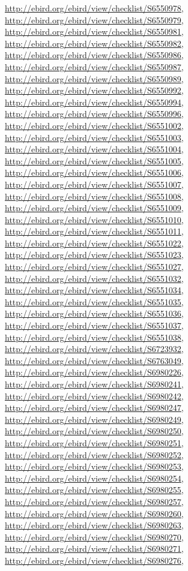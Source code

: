 \documentclass[9pt, article]{memoir}
\begin{document}
\begin{multicols}{2}
\url{http://ebird.org/ebird/view/checklist/S6550978}, 
\url{http://ebird.org/ebird/view/checklist/S6550979}, 
\url{http://ebird.org/ebird/view/checklist/S6550981}, 
\url{http://ebird.org/ebird/view/checklist/S6550982}, 
\url{http://ebird.org/ebird/view/checklist/S6550986}, 
\url{http://ebird.org/ebird/view/checklist/S6550987}, 
\url{http://ebird.org/ebird/view/checklist/S6550989}, 
\url{http://ebird.org/ebird/view/checklist/S6550992}, 
\url{http://ebird.org/ebird/view/checklist/S6550994}, 
\url{http://ebird.org/ebird/view/checklist/S6550996}, 
\url{http://ebird.org/ebird/view/checklist/S6551002}, 
\url{http://ebird.org/ebird/view/checklist/S6551003}, 
\url{http://ebird.org/ebird/view/checklist/S6551004}, 
\url{http://ebird.org/ebird/view/checklist/S6551005}, 
\url{http://ebird.org/ebird/view/checklist/S6551006}, 
\url{http://ebird.org/ebird/view/checklist/S6551007}, 
\url{http://ebird.org/ebird/view/checklist/S6551008}, 
\url{http://ebird.org/ebird/view/checklist/S6551009}, 
\url{http://ebird.org/ebird/view/checklist/S6551010}, 
\url{http://ebird.org/ebird/view/checklist/S6551011}, 
\url{http://ebird.org/ebird/view/checklist/S6551022}, 
\url{http://ebird.org/ebird/view/checklist/S6551023}, 
\url{http://ebird.org/ebird/view/checklist/S6551027}, 
\url{http://ebird.org/ebird/view/checklist/S6551032}, 
\url{http://ebird.org/ebird/view/checklist/S6551034}, 
\url{http://ebird.org/ebird/view/checklist/S6551035}, 
\url{http://ebird.org/ebird/view/checklist/S6551036}, 
\url{http://ebird.org/ebird/view/checklist/S6551037}, 
\url{http://ebird.org/ebird/view/checklist/S6551038}, 
\url{http://ebird.org/ebird/view/checklist/S6723932}, 
\url{http://ebird.org/ebird/view/checklist/S6763049}, 
\url{http://ebird.org/ebird/view/checklist/S6980226}, 
\url{http://ebird.org/ebird/view/checklist/S6980241}, 
\url{http://ebird.org/ebird/view/checklist/S6980242}, 
\url{http://ebird.org/ebird/view/checklist/S6980247}, 
\url{http://ebird.org/ebird/view/checklist/S6980249}, 
\url{http://ebird.org/ebird/view/checklist/S6980250}, 
\url{http://ebird.org/ebird/view/checklist/S6980251}, 
\url{http://ebird.org/ebird/view/checklist/S6980252}, 
\url{http://ebird.org/ebird/view/checklist/S6980253}, 
\url{http://ebird.org/ebird/view/checklist/S6980254}, 
\url{http://ebird.org/ebird/view/checklist/S6980255}, 
\url{http://ebird.org/ebird/view/checklist/S6980257}, 
\url{http://ebird.org/ebird/view/checklist/S6980260}, 
\url{http://ebird.org/ebird/view/checklist/S6980263}, 
\url{http://ebird.org/ebird/view/checklist/S6980270}, 
\url{http://ebird.org/ebird/view/checklist/S6980271}, 
\url{http://ebird.org/ebird/view/checklist/S6980276}, 

\end{multicols}
\end{document}
